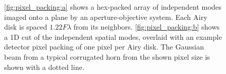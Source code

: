 \begin{figure}
    \centering
    \caption[Contour diagram of independent spatial modes on the focal plane]{\ref{fig:pixel_packing:a} shows a hex-packed array of independent modes imaged onto a plane by an aperture-objective system. Each Airy disk is spaced $1.22 F \lambda$ from its neighbors. \ref{fig:pixel_packing:b} shows a 1D cut of the independent spatial modes, overlaid with an example detector pixel packing of one pixel per Airy disk. The Gaussian beam from a typical corrugated horn from the shown pixel size is shown with a dotted line.}
    \label{fig:pixel_packing}
\end{figure}

